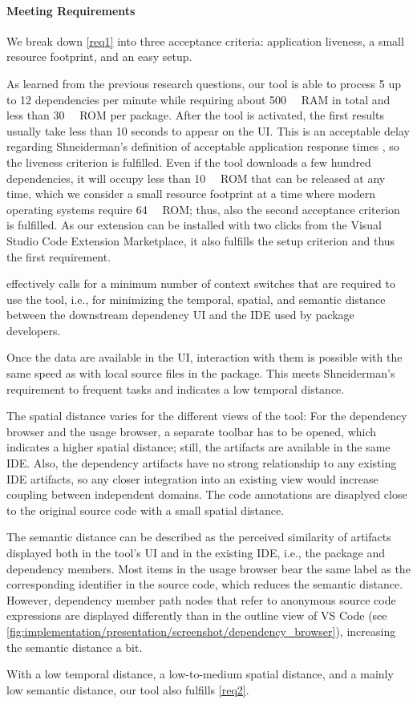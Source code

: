 \paragraph{Meeting Requirements}

We break down \cref{req1} into three acceptance criteria: application liveness, a small resource footprint, and an easy setup.

As learned from the previous research questions, our tool is able to process 5 up to 12 dependencies per minute while requiring about \SI{500}{\mega\byte} RAM in total and less than \SI{30}{\mega\byte} ROM per package.
After the tool is activated, the first results usually take less than 10 seconds to appear on the UI.
This is an acceptable delay regarding Shneiderman's definition of acceptable application response times \citep{shneiderman2010designing}, so the liveness criterion is fulfilled.
Even if the tool downloads a few hundred dependencies, it will occupy less than \SI{10}{\giga\byte} ROM that can be released at any time, which we consider a small resource footprint at a time where modern operating systems require \SI{64}{\giga\byte} ROM; thus, also the second acceptance criterion is fulfilled.
As our extension can be installed with two clicks from the Visual Studio Code Extension Marketplace, it also fulfills the setup criterion and thus the first requirement.

 effectively calls for a minimum number of context switches that are required to use the tool, i.e., for minimizing the temporal, spatial, and semantic distance \citep{ungar1997debugging} between the downstream dependency UI and the IDE used by package developers.

Once the data are available in the UI, interaction with them is possible with the same speed as with local source files in the package.
This meets Shneiderman's requirement to frequent tasks and indicates a low temporal distance.

The spatial distance varies for the different views of the tool:
For the dependency browser and the usage browser, a separate toolbar has to be opened, which indicates a higher spatial distance; still, the artifacts are available in the same IDE.
Also, the dependency artifacts have no strong relationship to any existing IDE artifacts, so any closer integration into an existing view would increase coupling between independent domains.
The code annotations are disaplyed close to the original source code with a small spatial distance.

The semantic distance can be described as the perceived similarity of artifacts displayed both in the tool's UI and in the existing IDE, i.e., the package and dependency members.
Most items in the usage browser bear the same label as the corresponding identifier in the source code, which reduces the semantic distance.
However, dependency member path nodes that refer to anonymous source code expressions are displayed differently than in the outline view of VS Code (see \cref{fig:implementation/presentation/screenshot/dependency_browser}), increasing the semantic distance a bit.

With a low temporal distance, a low-to-medium spatial distance, and a mainly low semantic distance, our tool also fulfills \cref{req2}.
